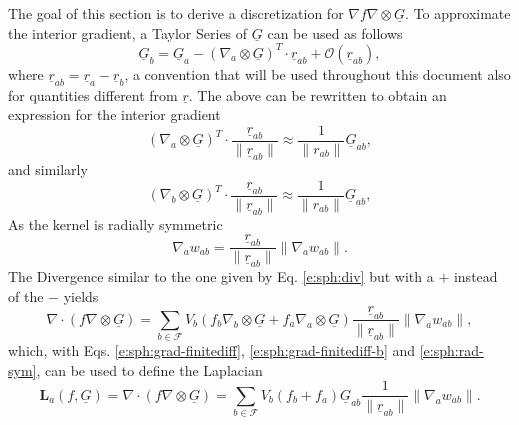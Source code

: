 \documentclass[12pt]{memoir}
\newcommand{\uvec}[1]{\underline{#1}}
\newcommand{\sumF}{\underset{b \in \mathcal{F}}{\sum}}
\newcommand{\Lap}{\textbf{L}}
\begin{document}
The goal of this section is to derive a discretization for $\nabla f
\nabla \otimes \uvec{G}$. To approximate the interior gradient, a
Taylor Series of $\uvec{G}$ can be used as follows
\begin{equation}
\uvec{G}_b = \uvec{G}_a - (\nabla_a \otimes \uvec{G})^T \cdot
\uvec{r}_{ab} + \mathcal{O}(\uvec{r}_{ab}),
\label{e:sph:taylor}
\end{equation}
where $\uvec{r}_{ab} = \uvec{r}_a - \uvec{r}_b$, a convention that will
be used throughout this document also for quantities different from
$\uvec{r}$.
The above can be rewritten to obtain an expression for the interior
gradient
\begin{equation}
(\nabla_a \otimes \uvec{G})^T \cdot
\frac{\uvec{r}_{ab}}{\|\uvec{r}_{ab}\|} \approx
\frac{1}{\|r_{ab}\|}\uvec{G}_{ab},
\label{e:sph:grad-finitediff}
\end{equation}
and similarly
\begin{equation}
(\nabla_b \otimes \uvec{G})^T \cdot
\frac{\uvec{r}_{ab}}{\|\uvec{r}_{ab}\|} \approx
\frac{1}{\|r_{ab}\|}\uvec{G}_{ab},
\label{e:sph:grad-finitediff-b}
\end{equation}
As the kernel is radially symmetric
\begin{equation}
\nabla_a w_{ab} = \frac{\uvec{r}_{ab}}{\|\uvec{r}_{ab}\|} \|\nabla_a
w_{ab}\|.
\label{e:sph:rad-sym}
\end{equation}
The Divergence similar to the one given by Eq.
\eqref{e:sph:div} but with a $+$ instead of the $-$ yields
\begin{equation}
\nabla \cdot (f \nabla \otimes \uvec{G}) = \sumF V_b (f_b \nabla_b
\otimes \uvec{G} + f_a \nabla_a \otimes \uvec{G})
\frac{\uvec{r}_{ab}}{\|\uvec{r}_{ab}\|} \|\nabla_a w_{ab}\|,
\end{equation}
which, with Eqs. \eqref{e:sph:grad-finitediff},
\eqref{e:sph:grad-finitediff-b} and \eqref{e:sph:rad-sym}, can be used to
define the Laplacian
\begin{equation}
\Lap_a(f, \uvec{G}) = \nabla \cdot (f \nabla \otimes \uvec{G}) = \sumF
V_b (f_b + f_a) \uvec{G}_{ab} \frac{1}{\|\uvec{r}_{ab}\|} \|\nabla_a w_{ab}\|.
\label{e:sph:lap}
\end{equation}
\end{document}
